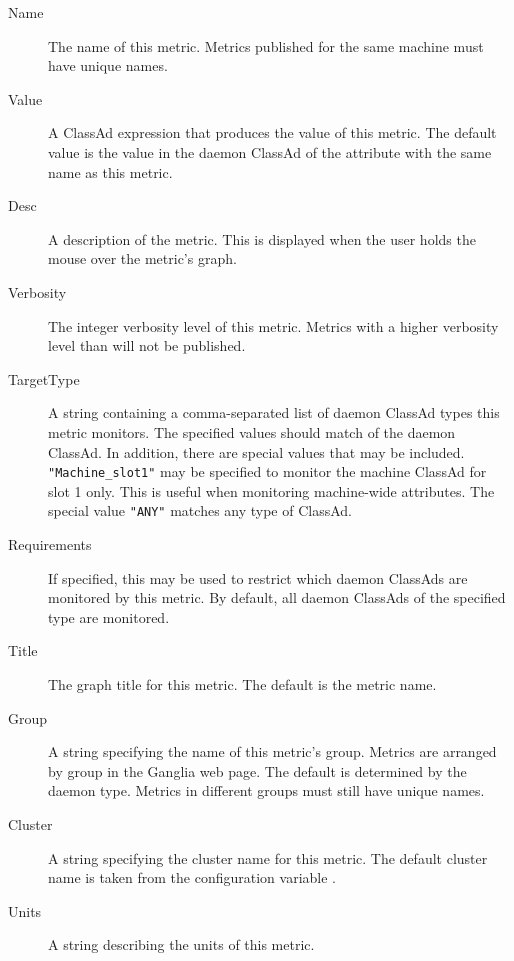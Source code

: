   \begin{description}

  \item[Name] The name of this metric.  Metrics published for the same
    machine must have unique names.

  \item[Value] A ClassAd expression that produces the value of this
    metric.  The default value is the value in the daemon ClassAd of the
    attribute with the same name as this metric.

  \item[Desc] A description of the metric.  This is displayed when the
    user holds the mouse over the metric's graph.

  \item[Verbosity] The integer verbosity level of this metric.  Metrics
    with a higher verbosity level than  will
    not be published.

  \item[TargetType] A string containing a comma-separated list of daemon
    ClassAd types this metric monitors.  The specified values should
    match  of the daemon ClassAd.  In addition, there are
    special values that may be included. \verb|"Machine_slot1"| may be
    specified to monitor the machine ClassAd for slot 1 only.  This is
    useful when monitoring machine-wide attributes.  The special
    value \verb|"ANY"| matches any type of ClassAd.

  \item[Requirements] If specified, this may be used to restrict which
    daemon ClassAds are monitored by this metric.  By default, all daemon
    ClassAds of the specified type are monitored.

  \item[Title] The graph title for this metric.  The default is the
    metric name.

  \item[Group] A string specifying the name of this metric's group.
    Metrics are arranged by group in the Ganglia web page.  The
    default is determined by the daemon type.  Metrics in different
    groups must still have unique names.

  \item[Cluster] A string specifying the cluster name for this metric.
    The default cluster name is taken from the configuration variable
    .

  \item[Units] A string describing the units of this metric.


\end{description}
